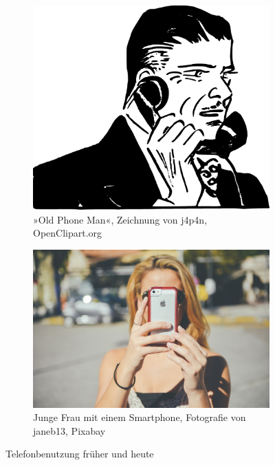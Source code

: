 \documentclass{scrartcl}
\begin{document}
\blindtext

\begin{figure}[h]

\begin{subfigure}[b]{.5\textwidth}
\includegraphics[width=\textwidth,angle=-1]{1542174211.eps}
\caption{»Old Phone Man«, Zeichnung von j4p4n, OpenClipart.org}
\end{subfigure}
\quad %

\begin{subfigure}[b]{.5\textwidth}
\centering
\includegraphics[width=\textwidth]{girl-1192032_1280.jpg}
\caption{Junge Frau mit einem Smartphone, Fotografie von janeb13, Pixabay}
\end{subfigure}

\caption{Telefonbenutzung früher und heute}
\end{figure}

\blindtext
\end{document}
